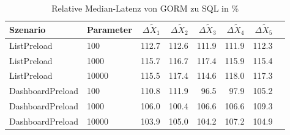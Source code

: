 
\begin{table}[ht]
\setlength{\extrarowheight}{-1pt}
\centering
\caption{Relative Median-Latenz von GORM zu SQL in \%}
\begin{tabular}{llrrrrrr}
\toprule
Szenario & Parameter & ${\Delta \tilde{X}_1}$ & ${\Delta \tilde{X}_2}$ & ${\Delta \tilde{X}_3}$ & ${\Delta \tilde{X}_4}$ & ${\Delta \tilde{X}_5}$ \\
\midrule
	ListPreload & 100 & \cellcolor{red!15}  112.7 & \cellcolor{red!15}  112.6 & \cellcolor{red!15}  111.9 & \cellcolor{red!15}  111.9 & \cellcolor{red!15}  112.3 \\
	ListPreload & 1000 & \cellcolor{red!16}  115.7 & \cellcolor{red!17}  116.7 & \cellcolor{red!17}  117.4 & \cellcolor{red!16}  115.9 & \cellcolor{red!16}  115.4 \\
	ListPreload & 10000 & \cellcolor{red!16}  115.5 & \cellcolor{red!17}  117.4 & \cellcolor{red!16}  114.6 & \cellcolor{red!17}  118.0 & \cellcolor{red!17}  117.3 \\
	DashboardPreload & 100 & \cellcolor{red!14}  110.8 & \cellcolor{red!15}  111.9 & \cellcolor{green!11}  96.5 & \cellcolor{green!11}  97.9 & \cellcolor{red!12}  105.2 \\
	DashboardPreload & 1000 & \cellcolor{red!12}  106.0 &  100.4 & \cellcolor{red!13}  106.6 & \cellcolor{red!13}  106.6 & \cellcolor{red!14}  109.3 \\
	DashboardPreload & 10000 & \cellcolor{red!12}  103.9 & \cellcolor{red!12}  105.0 & \cellcolor{red!12}  104.2 & \cellcolor{red!13}  107.2 & \cellcolor{red!12}  104.9 \\
\bottomrule
\end{tabular}
\label{tab:relativer_durchsatz_gorm}
\end{table}
	